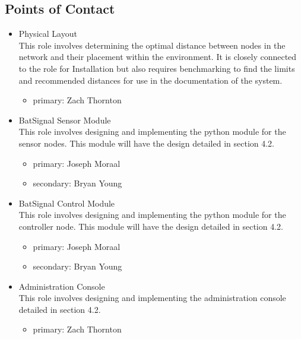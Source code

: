 \documentclass[11pt,a4paper]{article}
\begin{document}
\subsection{Points of Contact}
\begin{itemize}
    \item{Physical Layout} \\
    This role involves determining the optimal distance between nodes in the network and their placement within the environment.  It is closely connected to the role for Installation but also requires benchmarking to find the limits and recommended distances for use in the documentation of the system.
    \begin{itemize}
        \item{primary: Zach Thornton}
    \end{itemize}
    \item{BatSignal Sensor Module} \\
    This role involves designing and implementing the python module for the sensor nodes.  This module will have the design detailed in section 4.2.
    \begin{itemize}
        \item{primary: Joseph Moraal}
        \item{secondary: Bryan Young}
    \end{itemize}
    \item{BatSignal Control Module} \\
    This role involves designing and implementing the python module for the controller node.  This module will have the design detailed in section 4.2.
    \begin{itemize}
        \item{primary: Joseph Moraal}
        \item{secondary: Bryan Young}
    \end{itemize}
    \item{Administration Console} \\
    This role involves designing and implementing the administration console detailed in section 4.2.
    \begin{itemize}
        \item{primary: Zach Thornton}

\end{itemize}
\end{itemize}
\end{document}
